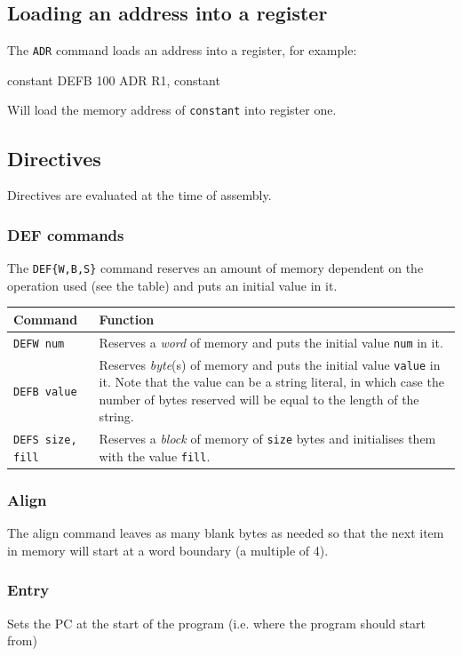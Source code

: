 \documentclass{article}
\begin{document}
\subsection{Loading an address into a register}

The {\tt ADR} command loads an address into a register, for example:

\begin{listing}{1}
constant	DEFB	100
		ADR	R1, constant
\end{listing}

Will load the memory address of {\tt constant} into register one.

\subsection{Directives}
Directives are evaluated at the time of assembly.

\subsubsection{DEF commands}

The {\tt DEF\{W,B,S\}} command reserves an amount of memory dependent on the operation used (see the table) and puts an initial value in it.

\begin{tabularx}{\textwidth}{l|X}
	{\bf Command} & {\bf Function}\\ \hline
	{\tt DEFW num} & Reserves a {\it word} of memory and puts the initial value {\tt num} in it.\\ \hline
	{\tt DEFB value} & Reserves {\it byte}(s) of memory and puts the initial value {\tt value} in it. Note that the value can be a string literal, in which case the number of bytes reserved will be equal to the length of the string.\\ \hline
	{\tt DEFS size, fill} & Reserves a {\it block} of memory of {\tt size} bytes and initialises them with the value {\tt fill}. \\ \hline	
\end{tabularx}

\subsubsection{Align}
\label{subsubsec:align}
The align command leaves as many blank bytes as needed so that the next item in memory will start at a word boundary (a multiple of 4).

\subsubsection{Entry}
Sets the PC at the start of the program (i.e. where the program should start from)
\end{document}
